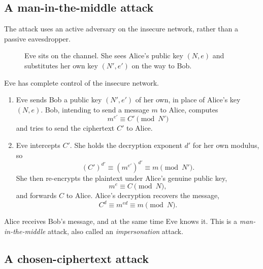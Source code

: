 \subsection{A man-in-the-middle attack}

The attack uses an active adversary on the insecure network, rather than a passive eavesdropper.

\begin{figure}[H]
\centering
{}
\caption{Eve sits on the channel. She sees Alice's public key $(N,e)$ and substitutes her own key $(N',e')$ on the way to Bob.}
\end{figure}


Eve has complete control of the insecure network.
\begin{enumerate}[leftmargin=1.6em]
    \item Eve sends Bob a public key $(N',e')$ of her own, in place of Alice's key $(N,e)$. Bob, intending to send a message $m$ to Alice, computes
    \[
        m^{e'}\equiv C'\pmod{N'}
    \]
    and tries to send the ciphertext $C'$ to Alice.
    \item Eve intercepts $C'$. She holds the decryption exponent $d'$ for her own modulus, so
    \[
        (C')^{d'}\equiv (m^{e'})^{d'}\equiv m\pmod{N'}.
    \]
    She then re-encrypts the plaintext under Alice's genuine public key,
    \[
        m^{e}\equiv C\pmod{N},
    \]
    and forwards $C$ to Alice. Alice's decryption recovers the message,
    \[
        C^{d}\equiv m^{ed}\equiv m\pmod{N}.
    \]
\end{enumerate}
Alice receives Bob's message, and at the same time Eve knows it. This is a \emph{man-in-the-middle} attack, also called an \emph{impersonation} attack.


\subsection{A chosen-ciphertext attack}

